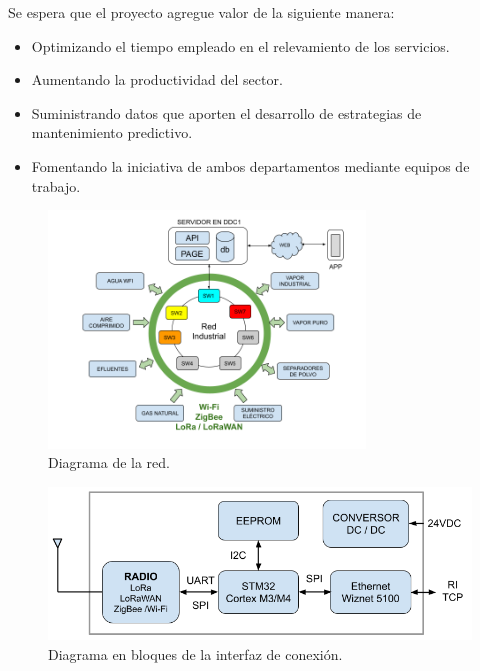 \documentclass[
11pt%
]{charter}
\begin{document}
Se espera que el proyecto agregue valor de la siguiente manera:
\begin{itemize}
	\item Optimizando el tiempo empleado en el relevamiento de los servicios.
	\item Aumentando la productividad del sector.
	\item Suministrando datos que aporten el desarrollo de estrategias de mantenimiento predictivo.
	\item Fomentando la iniciativa de ambos departamentos mediante equipos de trabajo.
\end{itemize}



\begin{figure}[htpb]
\centering 
\includegraphics[width=0.75\textwidth]{./Figuras/diagrama_red_cel.png}
\caption{Diagrama de la red.}
\label{fig:diagBloques}
\end{figure}

\vspace{5px}

\begin{figure}[htpb]
\centering 
\includegraphics[width=.75\textwidth]{./Figuras/Interfaz_conn.png}
\caption{Diagrama en bloques de la interfaz de conexión.}
\label{fig:diagBloques}
\end{figure}
\end{document}
